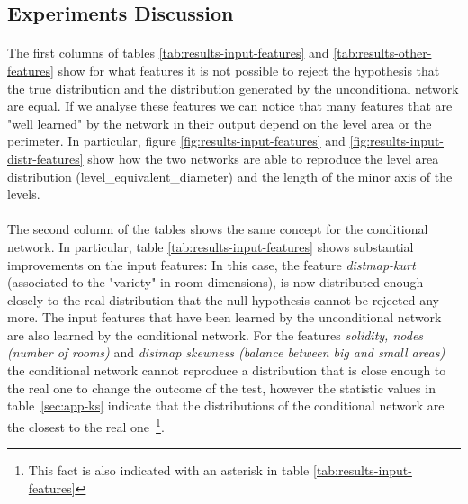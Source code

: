\subsection{Experiments Discussion}
\paragraph{} The first columns of tables \ref{tab:results-input-features} and \ref{tab:results-other-features} show for what features it is not possible to reject the hypothesis that the true distribution and the distribution generated by the unconditional network are equal. If we analyse these features we can notice that many features that are "well learned" by the network in their output depend on the level area or the perimeter. In particular, figure \ref{fig:results-input-features} and \ref{fig:results-input-distr-features} show how the two networks are able to reproduce the level area distribution (level\_equivalent\_diameter) and the length of the minor axis of the levels. 

\paragraph{} The second column of the tables shows the same concept for the conditional network. In particular, table \ref{tab:results-input-features} shows substantial improvements on the input features: In this case, the feature  \textit{distmap-kurt} (associated to the "variety" in room dimensions), is now distributed enough closely to the real distribution that the null hypothesis cannot be rejected any more. The input features that have been learned by the unconditional network are also learned by the conditional network. For the features \textit{solidity, nodes (number of rooms)} and \textit{distmap skewness (balance between big and small areas)} the conditional network cannot reproduce a distribution that is close enough to the real one to change the outcome of the test, however the statistic values in table~\ref{sec:app-ks} indicate that the distributions of the conditional network are the closest to the real one~\footnote{This fact is also indicated with an asterisk in table \ref{tab:results-input-features}}.

